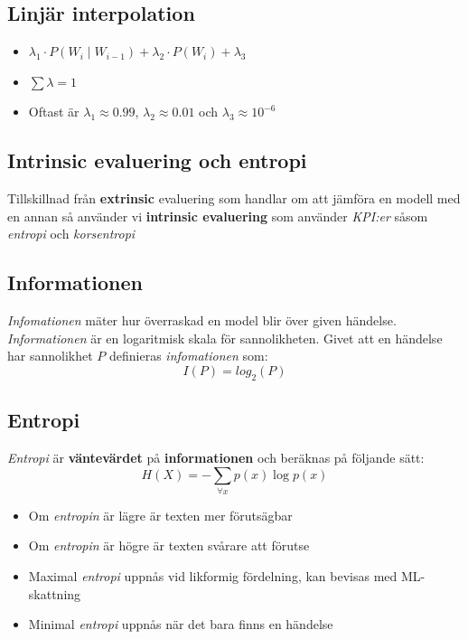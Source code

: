 \documentclass[12pt,a4paper]{article}
\begin{document}
\noindent\hrulefill
\subsection*{Linjär interpolation}
\begin{itemize}
    \item $\lambda_1 \cdot P(W_i \mid W_{i-1}) + \lambda_2 \cdot P(W_i) + \lambda_3$
    \item $\sum \lambda = 1$
    \item Oftast är $\lambda_1 \approx 0.99$, $\lambda_2 \approx 0.01$ och $\lambda_3 \approx 10^{-6}$ 
\end{itemize}

\noindent\hrulefill

\subsection*{Intrinsic evaluering och entropi}
Tillskillnad från \textbf{extrinsic} evaluering som handlar om att jämföra en modell med en annan så använder vi \textbf{intrinsic evaluering} som använder \textit{KPI:er} såsom \textit{entropi} och \textit{korsentropi}
\newline
\newline

\noindent\hrulefill

\subsection*{Informationen}
\textit{Infomationen} mäter hur överraskad en model blir över given händelse. \textit{Informationen} är en logaritmisk skala för sannolikheten. Givet att en händelse har sannolikhet $P$ definieras \textit{infomationen} som:
$$I(P) = log_2(P)$$
\noindent\hrulefill

\newpage
\subsection*{Entropi}
\textit{Entropi} är \textbf{väntevärdet} på \textbf{informationen} och beräknas på följande sätt:
{\Large $$H(X) = - \sum_{\forall x} p(x) \log p(x)$$}
\begin{itemize}
    \item Om \textit{entropin} är lägre är texten mer förutsägbar
    \item Om \textit{entropin} är högre är texten svårare att förutse
    \item Maximal \textit{entropi} uppnås vid likformig fördelning, kan bevisas med ML-skattning
    \item Minimal \textit{entropi} uppnås när det bara finns en händelse
\end{itemize}
\noindent\hrulefill
\end{document}
